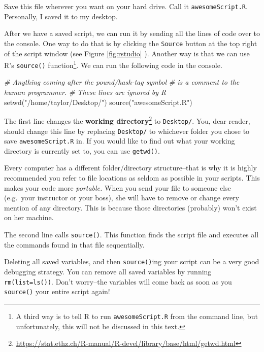 \documentclass[
  12pt,
  krantz2]{krantz}
\makeatletter
\newenvironment{Shaded}{\begin{snugshade}}{\end{snugshade}}
\newcommand{\CommentTok}[1]{\textcolor[rgb]{0.37,0.37,0.37}{\textit{#1}}}
\newcommand{\FunctionTok}[1]{\textcolor[rgb]{0,0,0}{#1}}
\newcommand{\NormalTok}[1]{#1}
\newcommand{\StringTok}[1]{\textcolor[rgb]{0.5,0.5,0.5}{#1}}
\renewcommand{\href}[2]{#2\footnote{\url{#1}}}
\newenvironment{kframe}{%
\medskip{}
\setlength{\fboxsep}{.8em}
 \def\at@end@of@kframe{}%
 \ifinner\ifhmode%
  \def\at@end@of@kframe{\end{minipage}}%
  \begin{minipage}{\columnwidth}%
 \fi\fi%
 \def\FrameCommand##1{\hskip\@totalleftmargin \hskip-\fboxsep
 \colorbox{shadecolor}{##1}\hskip-\fboxsep
     \hskip-\linewidth \hskip-\@totalleftmargin \hskip\columnwidth}%
 \MakeFramed {\advance\hsize-\width
   \@totalleftmargin\z@ \linewidth\hsize
   \@setminipage}}%
 {\par\unskip\endMakeFramed%
 \at@end@of@kframe}
\renewenvironment{Shaded}{\begin{kframe}}{\end{kframe}}
\newenvironment{rmd-details}{\begin{lrbox}{\rmdbox}
  \minipage[c]{\dimexpr \textwidth-2\fboxrule-\wd\bulb-\columnsep}
    \vspace*{\columnsep}}%
{\vspace*{\columnsep}\endminipage\end{lrbox}%
  {\par\color{green}\fboxsep=0pt
    \fbox{\usebox\bulb\usebox\rmdbox\hspace{\columnsep}}\par}}
\makeatother
\begin{document}
Save this file wherever you want on your hard drive. Call it \texttt{awesomeScript.R}. Personally, I saved it to my desktop.

After we have a saved script, we can run it by sending all the lines of code over to the console. One way to do that is by clicking the \texttt{Source} button at the top right of the script window (see Figure \ref{fig:rstudio} ). Another way is that we can use R's \texttt{source()} function\footnote{A third way is to tell R to run \texttt{awesomeScript.R} from the command line, but unfortunately, this will not be discussed in this text.}. We can run the following code in the console.

\begin{Shaded}
\begin{Highlighting}[]
\CommentTok{\# Anything coming after the pound/hash{-}tag symbol }
\CommentTok{\# is a comment to the human programmer.}
\CommentTok{\# These lines are ignored by R}
\FunctionTok{setwd}\NormalTok{(}\StringTok{"/home/taylor/Desktop/"}\NormalTok{)}
\FunctionTok{source}\NormalTok{(}\StringTok{"awesomeScript.R"}\NormalTok{)}
\end{Highlighting}
\end{Shaded}

The first line changes the \href{https://stat.ethz.ch/R-manual/R-devel/library/base/html/getwd.html}{\textbf{working directory}} to \texttt{Desktop/}. You, dear reader, should change this line by replacing \texttt{Desktop/} to whichever folder you chose to save \texttt{awesomeScript.R} in. If you would like to find out what your working directory is currently set to, you can use \texttt{getwd()}.

\begin{rmd-details}
Every computer has a different folder/directory structure--that is why it is highly recommended you refer to file locations as seldom as possible in your scripts. This makes your code more \emph{portable.} When you send your file to someone else (e.g.~your instructor or your boss), she will have to remove or change every mention of any directory. This is because those directories (probably) won't exist on her machine.

\end{rmd-details}

The second line calls \texttt{source()}. This function finds the script file and executes all the commands found in that file sequentially.

\begin{rmd-details}
Deleting all saved variables, and then \texttt{source()}ing your script can be a very good debugging strategy. You can remove all saved variables by running \texttt{rm(list=ls())}. Don't worry--the variables will come back as soon as you \texttt{source()} your entire script again!

\end{rmd-details}
\end{document}
